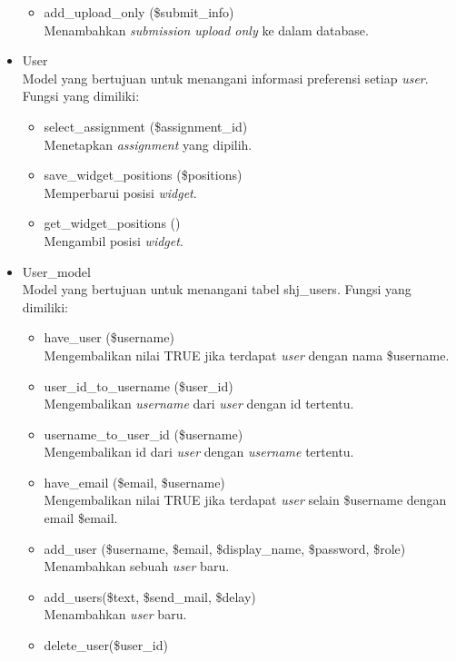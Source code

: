\begin{itemize}
\begin{itemize}
    \item add\_upload\_only (\$submit\_info)\\
 Menambahkan \textit{submission upload only} ke dalam database.
        \end{itemize}
        \item User \\
 Model yang bertujuan untuk menangani informasi preferensi setiap \textit{user}. Fungsi yang dimiliki:
    \begin{itemize}
        \item select\_assignment (\$assignment\_id)\\
 Menetapkan \textit{assignment} yang dipilih.
        \item save\_widget\_positions (\$positions)\\
 Memperbarui posisi \textit{widget}.
        \item get\_widget\_positions ()\\
 Mengambil posisi \textit{widget}.
    \end{itemize}
    \item User\_model\\
 Model yang bertujuan untuk menangani tabel shj\_users. Fungsi yang dimiliki:
    \begin{itemize}
        \item have\_user (\$username)\\
 Mengembalikan nilai TRUE jika terdapat \textit{user} dengan nama \$username.
    \item user\_id\_to\_username (\$user\_id)\\
 Mengembalikan \textit{username} dari \textit{user} dengan id tertentu.
    \item username\_to\_user\_id (\$username)\\
 Mengembalikan id dari \textit{user} dengan \textit{username} tertentu.
    \item have\_email (\$email, \$username)\\
 Mengembalikan nilai TRUE jika terdapat \textit{user} selain \$username dengan email \$email.
    \item add\_user (\$username, \$email, \$display\_name, \$password, \$role)\\
 Menambahkan sebuah \textit{user} baru.
    \item add\_users(\$text, \$send\_mail, \$delay)\\
    Menambahkan \textit{user} baru.
    \item delete\_user(\$user\_id)\\

\end{itemize}
\end{itemize}
